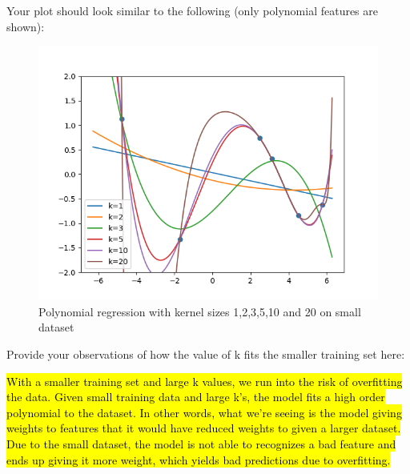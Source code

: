 Your plot should look similar to the following (only polynomial features are shown):
\begin{figure}[H]
  \centering
  \includegraphics[width=0.65\linewidth]{featuremaps/src/small-poly.png}
  \caption{Polynomial regression with kernel sizes 1,2,3,5,10 and 20
  on small dataset}
\end{figure}

Provide your observations of how the value of k fits the smaller training set here:

\hl{
	With a smaller training set and large k values, we run into the risk of overfitting the data. Given small training data and large k's, the model fits a high order polynomial to the dataset. In other words, what we're seeing is the model giving weights to features that it would have reduced weights to given a larger dataset. Due to the small dataset, the model is not able to recognizes a bad feature and ends up giving it more weight, which yields bad predictions due to overfitting.
}
